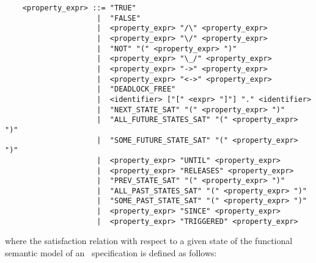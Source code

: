         \begin{verbatim}
    <property_expr> ::= "TRUE"
                     |  "FALSE"
                     |  <property_expr> "/\" <property_expr>
                     |  <property_expr> "\/" <property_expr>
                     |  "NOT" "(" <property_expr> ")"
                     |  <property_expr> "\_/" <property_expr>
                     |  <property_expr> "->" <property_expr>
                     |  <property_expr> "<->" <property_expr>
                     |  "DEADLOCK_FREE"
                     |  <identifier> ["[" <expr> "]"] "." <identifier>
                     |  "NEXT_STATE_SAT" "(" <property_expr> ")"
                     |  "ALL_FUTURE_STATES_SAT" "(" <property_expr> ")"
                     |  "SOME_FUTURE_STATE_SAT" "(" <property_expr> ")"
                     |  <property_expr> "UNTIL" <property_expr>
                     |  <property_expr> "RELEASES" <property_expr>
                     |  "PREV_STATE_SAT" "(" <property_expr> ")"
                     |  "ALL_PAST_STATES_SAT" "(" <property_expr> ")"
                     |  "SOME_PAST_STATE_SAT" "(" <property_expr> ")"
                     |  <property_expr> "SINCE" <property_expr>
                     |  <property_expr> "TRIGGERED" <property_expr>
        \end{verbatim}

\noindent where the satisfaction relation with respect to a given state of the functional semantic model of
an \aemilia\ specification is defined as follows:

